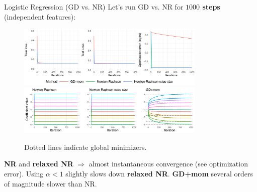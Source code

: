 \documentclass[11pt,compress,t,notes=noshow, xcolor=table]{beamer}
\begin{document}
\begin{vbframe}{Logistic Regression (GD vs. NR)}
\vspace{-0.4cm}
Let's run GD vs. NR for \textbf{$1000$ steps} (independent features):
\begin{figure}
            \includegraphics[width=0.8\textwidth]{figure_man/simu-newton/NR_GD_log_indep_1000iters.pdf} \\
             \includegraphics[width=0.8\textwidth]{figure_man/simu-newton/NR_GD_log_coef_1000indep.pdf}\\
            \begin{footnotesize}
            Dotted lines indicate global minimizers.
            \end{footnotesize}
\end{figure}
\vspace{-0.3cm}
\textbf{NR} and \textbf{relaxed NR} $\Rightarrow$ almost instantaneous convergence (see optimization error). Using $\alpha<1$ slightly slows down \textbf{relaxed NR}. \textbf{GD+mom} several orders of magnitude slower than NR. 
\end{vbframe}
\end{document}
